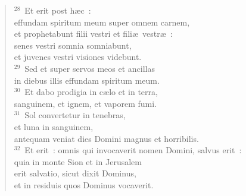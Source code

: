 \begin{flushleft}\begin{verse}${}^{28}$~Et erit post h\ae c~:\\ effundam spiritum meum super omnem carnem,\\ et prophetabunt filii vestri et fili\ae\ vestr\ae~:\\ senes vestri somnia somniabunt,\\ et juvenes vestri visiones videbunt.\\
${}^{29}$~Sed et super servos meos et ancillas\\ in diebus illis effundam spiritum meum.\\
${}^{30}$~Et dabo prodigia in c\ae lo et in terra,\\ sanguinem, et ignem, et vaporem fumi.\\
${}^{31}$~Sol convertetur in tenebras,\\ et luna in sanguinem,\\ antequam veniat dies Domini magnus et horribilis.\\
${}^{32}$~Et erit~: omnis qui invocaverit nomen Domini, salvus erit~:\\ quia in monte Sion et in Jerusalem\\ erit salvatio, sicut dixit Dominus,\\ et in residuis quos Dominus vocaverit.\end{verse}\end{flushleft}


